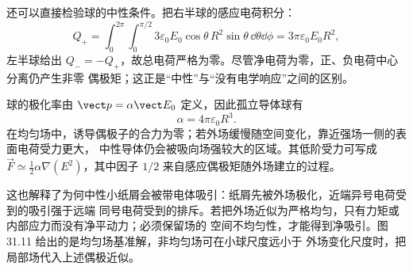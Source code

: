 \begin{xesolution}
还可以直接检验球的中性条件。把右半球的感应电荷积分：
\[
 Q_+=\int_0^{2\pi}\!\int_0^{\pi/2}
 3\varepsilon_0E_0\cos\theta\,R^2\sin\theta\,\dd\theta\dd\phi
 =3\pi\varepsilon_0E_0R^2,
\]
左半球给出 $Q_-=-Q_+$，故总电荷严格为零。尽管净电荷为零，正、负电荷中心分离仍产生非零
偶极矩；这正是“中性”与“没有电学响应”之间的区别。

球的极化率由 $\vect p=\alpha\vect E_0$ 定义，因此孤立导体球有
\[
 \boxed{\alpha=4\pi\varepsilon_0R^3}.
\]
在均匀场中，诱导偶极子的合力为零；若外场缓慢随空间变化，靠近强场一侧的表面电荷受力更大，
中性导体仍会被吸向场强较大的区域。其低阶受力可写成
$\vec F\simeq\tfrac12\alpha\nabla(E^2)$，其中因子 $1/2$ 来自感应偶极矩随外场建立的过程。

这也解释了为何中性小纸屑会被带电体吸引：纸屑先被外场极化，近端异号电荷受到的吸引强于远端
同号电荷受到的排斥。若把外场近似为严格均匀，只有力矩或内部应力而没有净平动力；必须保留场的
空间不均匀性，才能得到净吸引。图 31.11 给出的是均匀场基准解，非均匀场可在小球尺度远小于
外场变化尺度时，把局部场代入上述偶极近似。
\end{xesolution}
